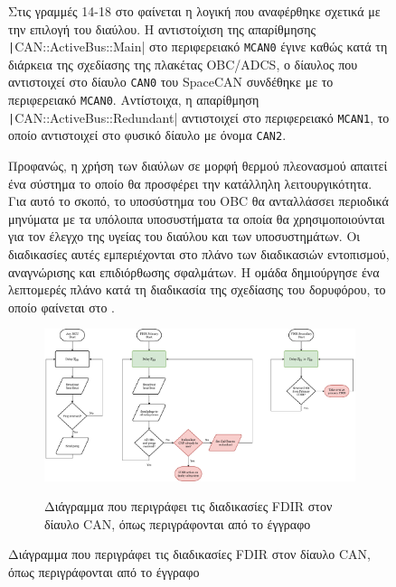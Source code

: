 \documentclass[a4paper,nobib,justified]{tufte-book}
\begin{document}
\begin{figure}
Στις γραμμές 14-18 στο  φαίνεται η λογική που αναφέρθηκε σχετικά με την επιλογή του διαύλου. Η αντιστοίχιση της απαρίθμησης \texttt|CAN::ActiveBus::Main| στο περιφερειακό \texttt{MCAN0} έγινε καθώς κατά τη διάρκεια της σχεδίασης της πλακέτας OBC/ADCS, ο δίαυλος που αντιστοιχεί στο δίαυλο \texttt{CAN0} του SpaceCAN  συνδέθηκε με το περιφερειακό \texttt{MCAN0}. Αντίστοιχα, η απαρίθμηση \texttt|CAN::ActiveBus::Redundant| αντιστοιχεί στο περιφερειακό \texttt{MCAN1}, το οποίο αντιστοιχεί στο φυσικό δίαυλο με όνομα \texttt{CAN2}.

Προφανώς, η χρήση των διαύλων σε μορφή θερμού πλεονασμού απαιτεί ένα σύστημα το οποίο θα προσφέρει την κατάλληλη λειτουργικότητα. Για αυτό το σκοπό, το υποσύστημα του OBC θα ανταλλάσσει περιοδικά μηνύματα με τα υπόλοιπα υποσυστήματα τα οποία θα χρησιμοποιούνται για τον έλεγχο της υγείας του διαύλου και των υποσυστημάτων. Οι διαδικασίες αυτές εμπεριέχονται στο πλάνο των διαδικασιών εντοπισμού, αναγνώρισης και επιδιόρθωσης σφαλμάτων. Η ομάδα δημιούργησε ένα λεπτομερές πλάνο κατά τη διαδικασία της σχεδίασης του δορυφόρου, το οποίο φαίνεται στο .

\begin{figure}
	\centering
	\includegraphics[width=1\linewidth]{media/diagrams/fdir-procedures.pdf}
	\label{fig:fdir}
	\caption{Διάγραμμα που περιγράφει τις διαδικασίες FDIR στον δίαυλο CAN, όπως περιγράφονται από το έγγραφο \cite{FMEA}}
\end{figure}


\end{figure}
\end{document}
